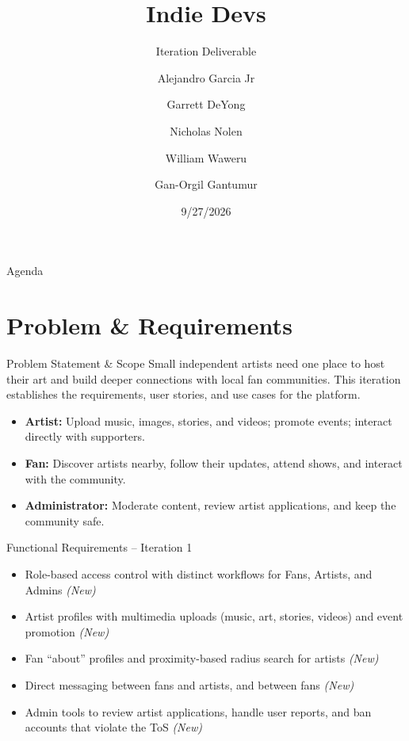 \documentclass[11pt,aspectratio=169]{beamer}
\title{Indie Devs}
\subtitle{Iteration \iterationNumber{} Deliverable}
\author{Alejandro Garcia Jr \and Garrett DeYong \and Nicholas Nolen \and William Waweru \and Gan-Orgil Gantumur}
\date{9/27/2026}
\newcommand{\iterationNumber}{1} %
\begin{document}
\maketitle

\begin{frame}{Agenda}
\tableofcontents
\end{frame}

\section{Problem \& Requirements}

\begin{frame}{Problem Statement \& Scope}
Small independent artists need one place to host their art and build deeper connections with local fan communities. This iteration establishes the requirements, user stories, and use cases for the platform.
\begin{itemize}
  \item \textbf{Artist:} Upload music, images, stories, and videos; promote events; interact directly with supporters.
  \item \textbf{Fan:} Discover artists nearby, follow their updates, attend shows, and interact with the community.
  \item \textbf{Administrator:} Moderate content, review artist applications, and keep the community safe.
\end{itemize}
\end{frame}

\begin{frame}{Functional Requirements -- Iteration \iterationNumber}
\begin{itemize}
  \item Role-based access control with distinct workflows for Fans, Artists, and Admins \hfill \textit{(New)}
  \item Artist profiles with multimedia uploads (music, art, stories, videos) and event promotion \hfill \textit{(New)}
  \item Fan ``about'' profiles and proximity-based radius search for artists \hfill \textit{(New)}
  \item Direct messaging between fans and artists, and between fans \hfill \textit{(New)}
  \item Admin tools to review artist applications, handle user reports, and ban accounts that violate the ToS \hfill \textit{(New)}
\end{itemize}
\end{frame}
\end{document}
